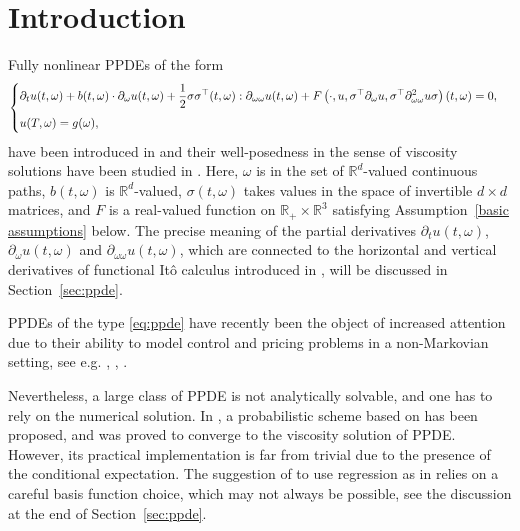 \documentclass[12pt]{article}
\numberwithin{equation}{section}
\newcommand{\real}{\mathbb{R}}
\let\oldcitet=\citet
\renewcommand{\cite}[1]{\textcolor[rgb]{0,0,1}{\oldcitet{#1}}}
\renewcommand{\citet}[1]{\textcolor[rgb]{0,0,1}{\oldcitet{#1}}}
\begin{document}
\section{Introduction}
 Fully nonlinear PPDEs of the form
\begin{equation}
    \label{eq:ppde}
    \begin{cases}
      \displaystyle
      \partial_t u (t, \omega) + b(t, \omega) \cdot \partial_\omega u(t, \omega)
	+ \frac{1}{2}\sigma\sigma^\top(t, \omega):\partial_{\omega\omega} u(t, \omega)
  + F\left( \cdot , u, \sigma^\top \partial_\omega u, \sigma^\top
	\partial^2_{\omega\omega}u\sigma\right)(t, \omega) = 0,
    \medskip
    \\
     u(T, \omega) = g(\omega),
    \end{cases}
\end{equation}
 have been introduced in
 \cite{peng2011note}
 and their well-posedness in the sense of viscosity solutions
 have been studied in
 \cite{ekren2014viscosity,ekren2016viscosity1,ekren2016viscosity2}.
 Here, $\omega$ is in the set
 of $\real^d$-valued continuous paths,
 $b (t,\omega )$ is $\real^d$-valued,
 $\sigma (t,\omega )$ takes values
 in the space of invertible $d\times d$ matrices,
 and $F$ is a real-valued function
 on $\real_+\times \real^3$ satisfying Assumption~\ref{basic assumptions} below.
 The precise meaning of the partial derivatives
$\partial_t u (t, \omega)$, $\partial_\omega u(t, \omega)$
and $\partial_{\omega\omega} u(t, \omega)$,
which are connected to
the horizontal and vertical derivatives
 of functional It\^o calculus introduced in \cite{dupire2009functional},
 will be discussed in Section~\ref{sec:ppde}.

 \medskip

 PPDEs of the type \eqref{eq:ppde} have recently been
 the object of increased attention
 due to their ability to model control and pricing problems
 in a non-Markovian setting, see e.g.
\cite{tang2015},
\cite{jacquier2019deep},
\cite{viens2019martingale}.

\medskip

Nevertheless, a large class of PPDE is not analytically solvable,
and one has to rely on the numerical solution.
In \cite{ren2017convergence}, a probabilistic scheme based on
\cite{fahim} has been proposed, and was proved
to converge to the viscosity solution of PPDE.
However, its practical implementation
is far from trivial due to the presence of the conditional expectation.
The suggestion of \cite{ren2017convergence}
to use regression as in \cite{gobet2005regression}
relies on a careful basis function choice, which may not always be possible,
see the discussion at the end of Section~\ref{sec:ppde}.
\end{document}
